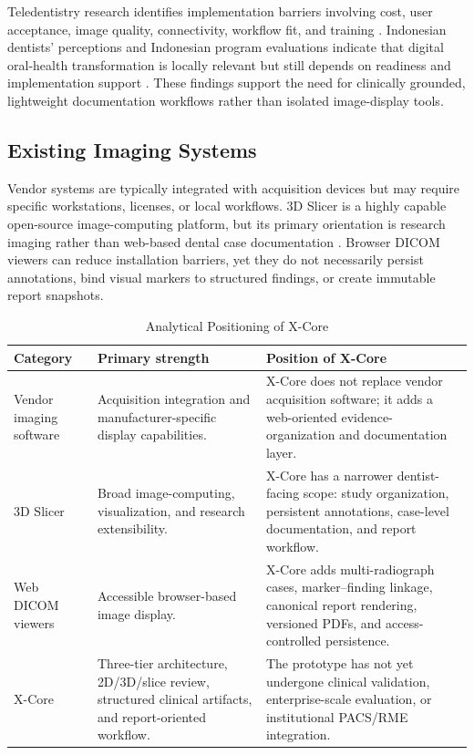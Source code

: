 \documentclass[journal]{IEEEtran}
\begin{document}
Teledentistry research identifies implementation barriers involving cost, user acceptance, image quality, connectivity, workflow fit, and training \cite{ref:fahim2022,ref:nemeth2023,ref:talla2024}. Indonesian dentists' perceptions and Indonesian program evaluations indicate that digital oral-health transformation is locally relevant but still depends on readiness and implementation support \cite{ref:soegyanto2022,ref:mathur2025}. These findings support the need for clinically grounded, lightweight documentation workflows rather than isolated image-display tools.

\subsection{Existing Imaging Systems}

Vendor systems are typically integrated with acquisition devices but may require specific workstations, licenses, or local workflows. 3D Slicer is a highly capable open-source image-computing platform, but its primary orientation is research imaging rather than web-based dental case documentation \cite{ref:fedorov2012}. Browser DICOM viewers can reduce installation barriers, yet they do not necessarily persist annotations, bind visual markers to structured findings, or create immutable report snapshots.

\begin{table}[!t]
\caption{Analytical Positioning of X-Core}
\label{tab:positioning}
\centering
\begin{tabular}{p{3.0cm}p{5.1cm}p{6.1cm}}
\toprule
\textbf{Category} & \textbf{Primary strength} & \textbf{Position of X-Core}\\
\midrule
Vendor imaging software & Acquisition integration and manufacturer-specific display capabilities. & X-Core does not replace vendor acquisition software; it adds a web-oriented evidence-organization and documentation layer.\\
3D Slicer & Broad image-computing, visualization, and research extensibility. & X-Core has a narrower dentist-facing scope: study organization, persistent annotations, case-level documentation, and report workflow.\\
Web DICOM viewers & Accessible browser-based image display. & X-Core adds multi-radiograph cases, marker--finding linkage, canonical report rendering, versioned PDFs, and access-controlled persistence.\\
X-Core & Three-tier architecture, 2D/3D/slice review, structured clinical artifacts, and report-oriented workflow. & The prototype has not yet undergone clinical validation, enterprise-scale evaluation, or institutional PACS/RME integration.\\
\bottomrule
\end{tabular}
\end{table}
\end{document}
